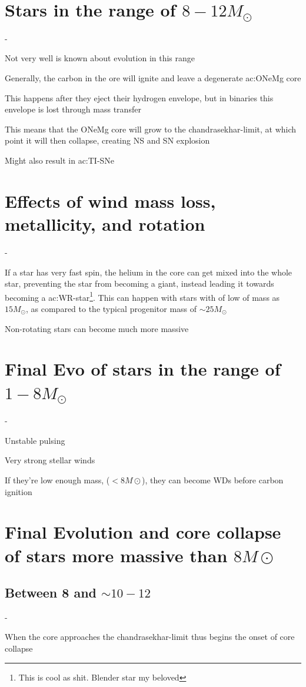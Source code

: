 \section{Stars in the range of \(8-12 M_\odot\)}
\begin{list}{-}{} \label{test}
\item Not very well is known about evolution in this range
\item Generally, the carbon in the ore will ignite and leave a degenerate \gls{ac:ONeMg} core
\item This happens after they eject their hydrogen envelope, but in binaries this envelope is lost through mass transfer
\item This means that the ONeMg core will grow to the \gls{chandrasekhar-limit}, at which point it will then collapse, creating NS and SN explosion
\item Might also result in \gls{ac:TI-SNe}
\end{list}


\section{Effects of wind mass loss, metallicity, and rotation}
\begin{list}{-}{}
\item If a star has very fast spin, the helium in the core can get mixed into the whole star, preventing the star from becoming a giant, instead leading it towards becoming a \gls{ac:WR-star}\footnote{This is cool as shit. Blender star my beloved}. This can happen with stars with of low of mass as \(15M_\odot\), as compared to the typical progenitor mass of \(\sim25M_\odot\)
\item Non-rotating stars can become much more massive
\end{list}

\section{Final Evo of stars in the range of \(1- 8 M_\odot\)}
\begin{list}{-}{}
\item Unstable pulsing
\item Very strong stellar winds
\item If they're low enough mass, (\(<8M\odot\)), they can become WDs before carbon ignition
\end{list}


\section{Final Evolution and core collapse of stars more massive than \(8M\odot\)}


\subsection{Between 8 and \(\sim 10 -12\)}
\begin{list}{-}{}
\item When the core approaches the \gls{chandrasekhar-limit} thus begins the onset of core collapse 
\item 
\end{list}


